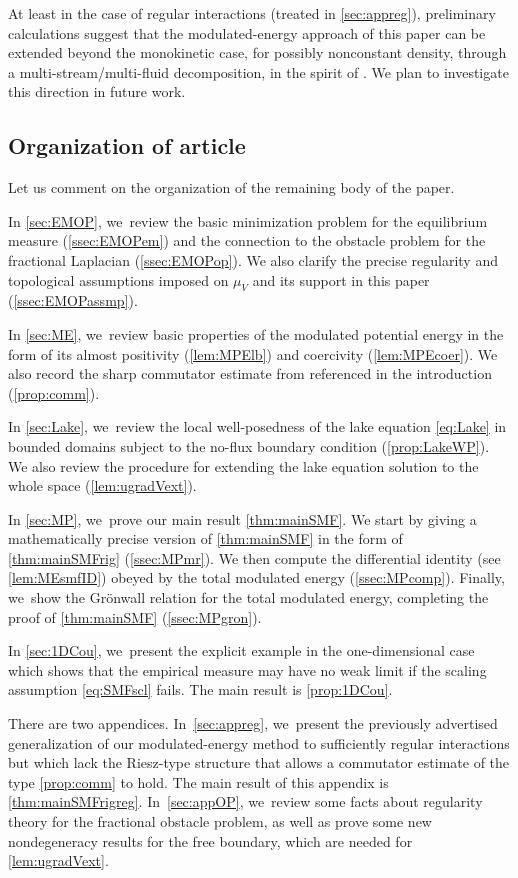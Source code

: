 \documentclass[JEP,XML,SOM,Unicode,published]{cedram}
\theoremstyle{plain}
\theoremstyle{definition}
\begin{document}
At least in the case of regular interactions (treated in \cref{sec:appreg}), preliminary calculations suggest that the modulated-energy approach of this paper can be extended beyond the monokinetic case, for possibly nonconstant density, through a multi-stream/multi-fluid decomposition, in the spirit of \cite{Grenier1996}. We plan to investigate this direction in future work.

\subsection{Organization of article}\label{ssec:introOrg}
Let us comment on the organization of the remaining body of the paper.

In \cref{sec:EMOP}, we~review the basic minimization problem for the equilibrium measure (\cref{ssec:EMOPem}) and the connection to the obstacle problem for the fractional Laplacian (\cref{ssec:EMOPop}). We also clarify the precise regularity and topological assumptions imposed on $\mu_V$ and its support in this paper (\cref{ssec:EMOPassmp}).

In \cref{sec:ME}, we~review basic properties of the modulated potential energy in the form of its almost positivity (\cref{lem:MPElb}) and coercivity (\cref{lem:MPEcoer}). We also record the sharp commutator estimate from \cite{RS2022} referenced in the introduction (\cref{prop:comm}).

In \cref{sec:Lake}, we~review the local well-posedness of the lake equation \eqref{eq:Lake} in bounded domains subject to the no-flux boundary condition (\cref{prop:LakeWP}). We also review the procedure for extending the lake equation solution to the whole space (\cref{lem:ugradVext}).

In \cref{sec:MP}, we~prove our main result \cref{thm:mainSMF}. We start by giving a mathematically precise version of \cref{thm:mainSMF} in the form of \cref{thm:mainSMFrig} (\cref{ssec:MPmr}). {We then compute the differential identity (see \cref{lem:MEsmfID}) obeyed by the total modulated energy (\cref{ssec:MPcomp}). Finally, we~show the Grönwall relation for the total modulated energy, completing the proof of \cref{thm:mainSMF} (\cref{ssec:MPgron}).}

In \cref{sec:1DCou}, we~present the explicit example in the one-dimensional case which shows that the empirical measure may have no weak limit if the scaling assumption \eqref{eq:SMFscl} fails. The main result is \cref{prop:1DCou}.

There are two appendices. In~\cref{sec:appreg}, we~present the previously advertised generalization of our modulated-energy method to sufficiently regular interactions but which lack the Riesz-type structure that allows a commutator estimate of the type \cref{prop:comm} to hold. The main result of this appendix is \cref{thm:mainSMFrigreg}. In~\cref{sec:appOP}, we~review some facts about regularity theory for the fractional obstacle problem, as well as prove some new nondegeneracy results for the free boundary, which are needed for \cref{lem:ugradVext}.
\end{document}
